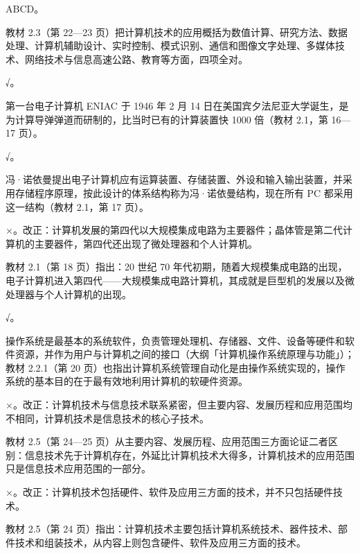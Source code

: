 \documentclass[a4paper,11pt]{article}
\begin{document}
\q ABCD。\begin{analysis}教材 2.3（第 22—23 页）把计算机技术的应用概括为数值计算、研究方法、数据处理、计算机辅助设计、实时控制、模式识别、通信和图像文字处理、多媒体技术、网络技术与信息高速公路、教育等方面，四项全对。\end{analysis}


\q √。\begin{analysis}第一台电子计算机 ENIAC 于 1946 年 2 月 14 日在美国宾夕法尼亚大学诞生，是为计算导弹弹道而研制的，比当时已有的计算装置快 1000 倍（教材 2.1，第 16—17 页）。\end{analysis}

\q √。\begin{analysis}冯·诺依曼提出电子计算机应有运算装置、存储装置、外设和输入输出装置，并采用存储程序原理，按此设计的体系结构称为冯·诺依曼结构，现在所有 PC 都采用这一结构（教材 2.1，第 17 页）。\end{analysis}

\q ×。改正：计算机发展的第四代以大规模集成电路为主要器件；晶体管是第二代计算机的主要器件，第四代还出现了微处理器和个人计算机。\begin{analysis}教材 2.1（第 18 页）指出：20 世纪 70 年代初期，随着大规模集成电路的出现，电子计算机进入第四代——大规模集成电路计算机，其成就是巨型机的发展以及微处理器与个人计算机的出现。\end{analysis}

\q √。\begin{analysis}操作系统是最基本的系统软件，负责管理处理机、存储器、文件、设备等硬件和软件资源，并作为用户与计算机之间的接口（大纲「计算机操作系统原理与功能」）；教材 2.2.1（第 20 页）也指出计算机系统管理自动化是由操作系统实现的，操作系统的基本目的在于最有效地利用计算机的软硬件资源。\end{analysis}

\q ×。改正：计算机技术与信息技术联系紧密，但主要内容、发展历程和应用范围均不相同，计算机技术是信息技术的核心子技术。\begin{analysis}教材 2.5（第 24—25 页）从主要内容、发展历程、应用范围三方面论证二者区别：信息技术先于计算机存在，外延比计算机技术大得多，计算机技术的应用范围只是信息技术应用范围的一部分。\end{analysis}

\q ×。改正：计算机技术包括硬件、软件及应用三方面的技术，并不只包括硬件技术。\begin{analysis}教材 2.5（第 24 页）指出：计算机技术主要包括计算机系统技术、器件技术、部件技术和组装技术，从内容上则包含硬件、软件及应用三方面的技术。\end{analysis}
\end{document}
